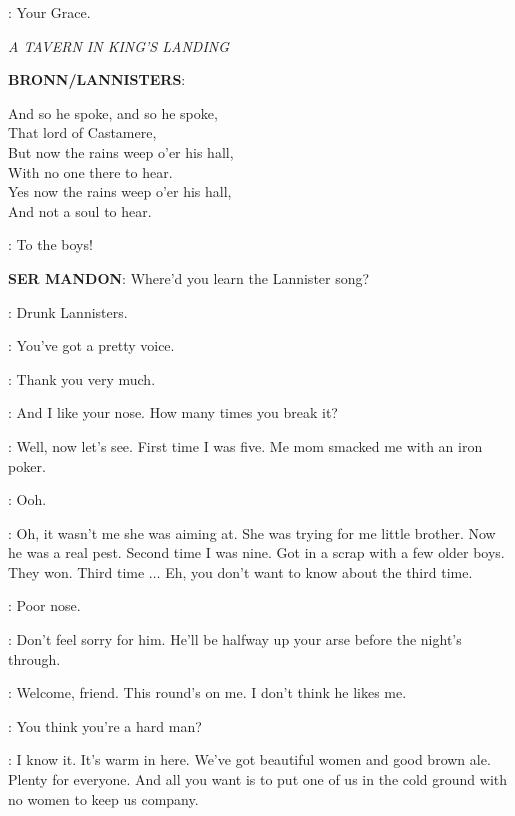 \PYCELLE: Your Grace.


\scene

\textit{A TAVERN IN KING'S LANDING}


\textbf{BRONN/LANNISTERS}:  

    And so he spoke, and so he spoke, \\
    That lord of Castamere, \\
    But now the rains weep o'er his hall, \\
    With no one there to hear. \\
    Yes now the rains weep o'er his hall, \\
    And not a soul to hear.

\BRONN:  To the boys! 


\textbf{SER MANDON}: Where'd you learn the Lannister song? 

\BRONN: Drunk Lannisters. 


\WHORE: You've got a pretty voice. 

\BRONN: Thank you very much. 

\WHORE: And I like your nose. How many times you break it? 

\BRONN: Well, now let's see. First time I was five. Me mom smacked me with an iron poker. 

\WHORE: Ooh. 

\BRONN: Oh, it wasn't me she was aiming at. She was trying for me little brother. Now he was a real pest. Second time I was nine. Got in a scrap with a few older boys. They won. Third time $\ldots$  Eh, you don't want to know about the third time. 

\WHORE: Poor nose. 

\BRONN: Don't feel sorry for him. He'll be halfway up your arse before the night's through. 


\BRONN: Welcome, friend. This round's on me.  I don't think he likes me. 

\HOUND: You think you're a hard man? 

\BRONN: I know it. It's warm in here. We've got beautiful women and good brown ale. Plenty for everyone. And all you want is to put one of us in the cold ground with no women to keep us company. 

